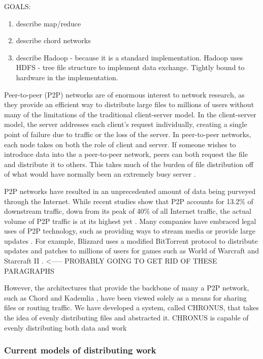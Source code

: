 \documentclass[conference, compsocconf, letterpaper]{IEEEtran}
\begin{document}
GOALS:
\begin{enumerate}
    \item describe map/reduce
    \item describe chord networks
    \item describe Hadoop - because it is a standard implementation.  Hadoop uses HDFS - tree file structure to implement data exchange.  Tightly bound to hardware in the implementation.
\end{enumerate}
Peer-to-peer (P2P) networks are of enormous interest to network research, as they provide an efficient way to distribute large files to millions of users without many of the limitations of the traditional client-server model. In the client-server model, the server addresses each client's request individually, creating a single point of failure due to traffic or the loss of the server.  In peer-to-peer networks, each node takes on both the role of client and server.  If someone wishes to introduce data into the a peer-to-peer network, peers can both request the file and distribute it to others.  This takes much of the burden of file distribution off of what would have normally been an extremely busy server \cite{Overview}.  

P2P networks have resulted in an unprecedented amount of data being purveyed through the Internet.  While recent studies show that P2P accounts for 13.2\% of downstream traffic, down from its peak of 40\% of all Internet traffic, the actual volume of P2P traffic is at its highest yet \cite{5713296}. Many companies have embraced legal uses of P2P technology, such as providing ways to stream media or provide large updates  \cite{P2PLegal}.  For example, Blizzard uses a modified BitTorrent protocol to distribute updates and patches to millions of users for games such as World of Warcraft and Starcraft II \cite{chehai2006analysis}.  <----- PROBABLY GOING TO GET RID OF THESE PARAGRAPHS


However, the architectures that provide the backbone of many a P2P network, such as Chord \cite{Chord} and Kademlia \cite{Kademlia}, have been viewed solely as a means for sharing files  or routing traffic.  We have developed a system, called CHRONUS, that takes the idea of evenly distributing files and abstracted it.  CHRONUS is capable of evenly distributing both data and work 


\subsubsection{Current models of distributing work}
\end{document}
